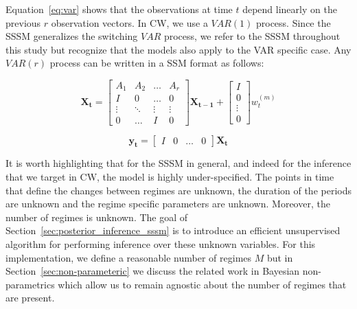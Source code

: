Equation~\ref{eq:var} shows that the observations at time $t$ depend linearly on the previous $r$ observation vectors. In CW, we use a $VAR(1)$ process. Since the SSSM generalizes the switching $VAR$ process, we refer to the SSSM throughout this study but recognize that the models also apply to the VAR specific case. Any $VAR(r)$ process can be written in a SSM format as follows:

\begin{equation}\label{eq:ssm_rep_of_var_state}
  \mathbf{X_t} =
  \begin{bmatrix}
      A_{1}       & A_{2} &  \dots & A_{r} \\
      I           & 0     &  \dots & 0 \\
      \vdots      & \ddots&  \vdots& \vdots \\
      0           & \hdots&   I    & 0
    \end{bmatrix} \mathbf{X_{t-1}} +
  \begin{bmatrix}
    I \\
    0 \\
    \vdots \\
    0
  \end{bmatrix} w^{(m)}_t
\end{equation}

\begin{equation}\label{eq:ssm_rep_of_var_output}
  \mathbf{y_t} = \begin{bmatrix} I & 0 & \hdots & 0 \end{bmatrix} \mathbf{X_t}
\end{equation}

It is worth highlighting that for the SSSM in general, and indeed for the inference that we target in CW, the model is highly under-specified. The points in time that define the changes between regimes are unknown, the duration of the periods are unknown and the regime specific parameters are unknown. Moreover, the number of regimes is unknown. The goal of Section~\ref{sec:posterior_inference_sssm} is to introduce an efficient unsupervised algorithm for performing inference over these unknown variables. For this implementation, we define a reasonable number of regimes $M$ but in Section~\ref{sec:non-parameteric} we discuss the related work in Bayesian non-parametrics which allow us to remain agnostic about the number of regimes that are present.




